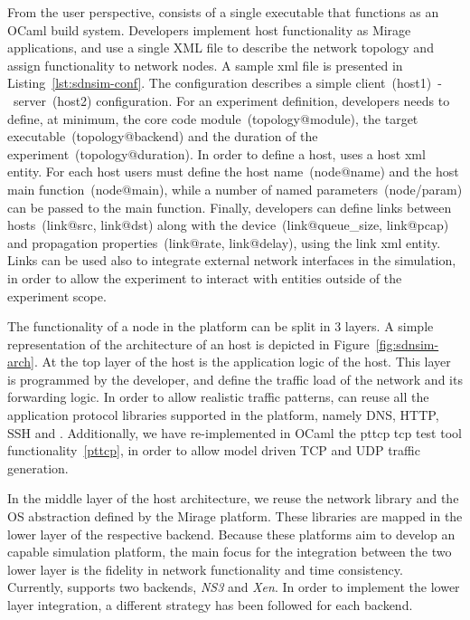 From the user perspective, \sdnsim consists of a single executable
that functions as an OCaml build system. Developers implement host
functionality as Mirage applications, and use a single XML file
to describe the network topology and assign functionality to network nodes.
A sample xml file is presented in Listing~\ref{lst:sdnsim-conf}. The
configuration describes a simple client~(host1)~-~server~(host2) configuration.
For an experiment definition, developers needs to define, at minimum,  the core
code module~(topology@module), the target executable~(topology@backend) and the
duration of the experiment~(topology@duration). In order to define a host,
\sdnsim uses a host xml entity. For each host users must define the host
name~(node@name) and the host main function~(node@main), while a number of named
parameters~(node/param) can be passed to the main function. Finally, developers
can define links between hosts~(link@src, link@dst) along with the
device~(link@queue\_size, link@pcap) and propagation properties~(link@rate,
link@delay), using the link xml entity. Links can be used also to integrate
external network interfaces in the simulation, in order to allow the experiment to
interact with entities outside of the experiment scope.

The functionality of a node in the \sdnsim platform can be split in 3 layers.  A
simple representation of the architecture of an \sdnsim host is depicted in
Figure~\ref{fig:sdnsim-arch}.  At the top layer of the host is the application
logic of the host. This layer is programmed by the developer, and define the
traffic load of the network and its forwarding logic. In order to allow
realistic traffic patterns, \sdnsim can reuse all the application protocol libraries
supported in the \mirage platform, namely DNS, HTTP, SSH and \of. Additionally,
we have re-implemented in OCaml the pttcp tcp test tool functionality~\ref{pttcp},
in order to allow model driven TCP and UDP traffic generation. 

In the middle layer of the host architecture, we reuse the network library and
the OS abstraction defined by the Mirage platform. These libraries are mapped in
the lower layer of the respective backend. Because these platforms aim to
develop an \of capable simulation platform, the main focus for the integration
between the two lower layer is the fidelity in network functionality and time
consistency. Currently, \sdnsim supports two backends, {\it NS3} and {\it Xen}.
In order to implement the lower layer integration, a different strategy has been 
followed for each backend. 

